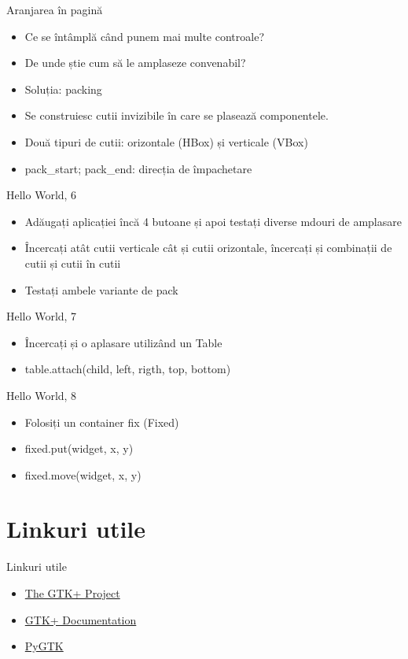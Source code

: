 \documentclass{beamer}
\begin{document}
\begin{frame}{Aranjarea în pagină}
\begin{itemize}
	\item Ce se întâmplă când punem mai multe controale?
	\item De unde știe cum să le amplaseze convenabil?
	\item \pause Soluția: packing
	\item \pause Se construiesc cutii invizibile în care se plasează componentele.
	\item \pause Două tipuri de cutii: orizontale (HBox) și verticale (VBox)
	\item \pause pack\_start; pack\_end: \pause direcția de împachetare
\end{itemize}
\end{frame}

\begin{frame}{Hello World, 6}
\begin{itemize}
	\item Adăugați aplicației încă 4 butoane și apoi testați diverse mdouri de amplasare
	\item Încercați atât cutii verticale cât și cutii orizontale, încercați și combinații de cutii și cutii în cutii
	\item Testați ambele variante de pack
\end{itemize}
\end{frame}

\begin{frame}{Hello World, 7}
\begin{itemize}
\item Încercați și o aplasare utilizând un Table
\item \pause table.attach(child, left, rigth, top, bottom)
\end{itemize}
\end{frame}

\begin{frame}{Hello World, 8}
\begin{itemize}
\item Folosiți un container fix (Fixed)
\item fixed.put(widget, x, y)
\item \pause fixed.move(widget, x, y)
\end{itemize}
\end{frame}

\section{Linkuri utile}
\frame{\tableofcontents[currentsection]}
\begin{frame}{Linkuri utile}
\begin{itemize}
\item \href{http://www.gtk.org/}{The GTK+ Project}
\item \href{http://www.gtk.org/documentation.html}{GTK+ Documentation}
\item \href{http://www.pygtk.org/index.html}{PyGTK}
\end{itemize}
\end{frame}
\end{document}
